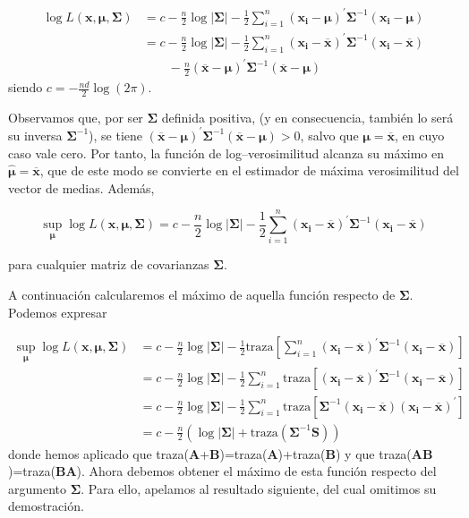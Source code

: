 \documentclass[
  a4paper,
  oneside]{scrbook}
\theoremstyle{definition}
\theoremstyle{definition}
\theoremstyle{definition}
\theoremstyle{definition}
\theoremstyle{remark}
\begin{document}
\[\begin{aligned}
\log L(\bm{x},\bm{\mu},\bm\Sigma) &= c - \frac{n}{2} \log |\bm\Sigma|
 - \frac{1}{2}\sum_{i=1}^n \left(\bm{x_i}-\bm{\mu}\right)^\prime{}\bm\Sigma^{-1} \left(\bm{x_i}-\bm{\mu}\right) \\
&= c - \frac{n}{2} \log |\bm\Sigma|
-\frac{1}{2} \sum_{i=1}^n \left(\bm{x_i}-\overline{\bm{x}}\right)^\prime{}\bm\Sigma^{-1} \left(\bm{x_i}-\overline{\bm{x}}\right)\\
&\qquad -\frac{n}{2}  \left(\overline{\bm{x}}-\bm{\mu}\right)^\prime{}\bm\Sigma^{-1} \left(\overline{\bm{x}}-\bm{\mu}\right)\end{aligned}\]
siendo \(c=-\frac{nd}{2}\log(2\pi)\).

Observamos que, por ser \(\bm\Sigma\) definida positiva, (y en
consecuencia, también lo será su inversa \(\bm\Sigma^{-1}\)), se tiene
\((\overline{\bm{x}}-\bm{\mu})^\prime{}\bm\Sigma^{-1}(\overline{\bm{x}}-\bm{\mu})>0\),
salvo que \(\bm{\mu}=\overline{\bm{x}}\), en cuyo caso vale cero. Por
tanto, la función de log--verosimilitud alcanza su máximo en
\(\hat{\bm{\mu}}=\overline{\bm{x}}\), que de este modo se convierte en el
estimador de máxima verosimilitud del vector de medias. Además,

\begin{equation}
\sup_{\bm\mu}\log L(\bm{x},\bm\mu,\bm\Sigma) = c - \frac{n}{2} \log |\bm\Sigma|
-\frac{1}{2} \sum_{i=1}^n \left(\bm{x_i}-\overline{\bm{x}}\right)^\prime{}\bm\Sigma^{-1} \left(\bm{x_i}-\overline{\bm{x}}\right)
\label{eq:supmu}
\end{equation}

para cualquier matriz de covarianzas \(\bm\Sigma\).

A continuación calcularemos el máximo de aquella función respecto de
\(\bm\Sigma\). Podemos expresar

\[\begin{aligned}
\sup_{\bm{\mu}}\log L(\bm{x},\bm{\mu},\bm\Sigma) &= c - \frac{n}{2} \log |\bm\Sigma|
-\frac{1}{2} \mbox{traza} \left[\sum_{i=1}^n
\left(\bm{x_i}-\overline{\bm{x}}\right)^\prime{}\bm\Sigma^{-1} \left(\bm{x_i}-\overline{\bm{x}}\right)\right] \nonumber \\
&= c - \frac{n}{2} \log |\bm\Sigma|
-\frac{1}{2} \sum_{i=1}^n \mbox{traza}
\left[\left(\bm{x_i}-\overline{\bm{x}}\right)^\prime{} \bm\Sigma^{-1} \left(\bm{x_i}-\overline{\bm{x}}\right)\right] \nonumber \\
&= c - \frac{n}{2} \log |\bm\Sigma|
-\frac{1}{2} \sum_{i=1}^n \mbox{traza}
\left[ \bm\Sigma^{-1} \left(\bm{x_i}-\overline{\bm{x}}\right) \left(\bm{x_i}-\overline{\bm{x}}\right)^\prime{} \right] \nonumber \\
&= c - \frac{n}{2}\left( \log |\bm\Sigma| + \mbox{traza} \left( \bm\Sigma^{-1} \bm{S} \right)\right)
\end{aligned}\]
donde hemos aplicado que
traza(\(\bm{A}\)+\(\bm{B}\))=traza(\(\bm{A}\))+traza(\(\bm{B}\)) y que
traza(\(\bm{AB}\))=traza(\(\bm{BA}\)). Ahora debemos obtener el máximo de
esta función respecto del argumento \(\bm\Sigma\). Para ello, apelamos al
resultado siguiente, del cual omitimos su demostración.
\end{document}
